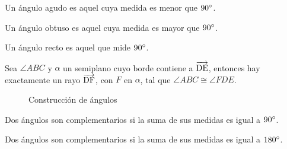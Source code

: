 \begin{definition}
    Un ángulo agudo es aquel cuya medida es menor que $90^{\circ}$.
\end{definition}

\begin{definition}
    Un ángulo obtuso es aquel cuya medida es mayor que $90^{\circ}$.
\end{definition}

\begin{definition}
    Un ángulo recto es aquel que mide $90^{\circ}$.
\end{definition}

\clearpage

\begin{theorem}
    Sea $\angle{ABC}$ y $\alpha$ un semiplano cuyo borde contiene a $\overrightarrow{\rm DE}$, entonces hay exactamente un rayo $\overrightarrow{\rm DF}$, con $F$ en $\alpha$, tal que $\angle{ABC} \cong \angle{FDE}$.

    \begin{figure}[h!]
    
        \centering
    
        \begin{subfigure}[b]{.3\textwidth}
            \centering
            
            \label{fig:postulado34}
        \end{subfigure}%
        \begin{subfigure}[b]{.3\textwidth}
            \centering
            
            \label{fig:postulado35}
        \end{subfigure}

        \caption{Construcción de ángulos}
        \label{fig:angle-const-theorem}
        
    \end{figure}        
    
\end{theorem}

\begin{definition}
    Dos ángulos son complementarios si la suma de sus medidas es igual a $90^{\circ}$.
\end{definition}

\begin{definition}
    Dos ángulos son complementarios si la suma de sus medidas es igual a $180^{\circ}$.
\end{definition}

